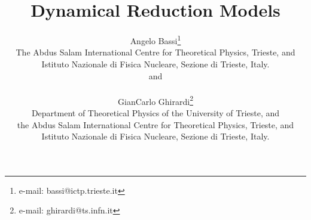 \documentclass[12pt]{article}
\begin{document}
\title{\bf Dynamical Reduction Models}

\author{Angelo Bassi\footnote{e-mail: bassi@ictp.trieste.it}\\
{\small The Abdus Salam International Centre for
Theoretical Physics, Trieste, and}\\{\small Istituto Nazionale di Fisica
Nucleare, Sezione di Trieste, Italy.}\\ and\\
\\ GianCarlo Ghirardi\footnote{e-mail: ghirardi@ts.infn.it}\\
{\small Department of Theoretical Physics of the University of
Trieste, and}\\ {\small the Abdus Salam International Centre for
Theoretical Physics, Trieste, and}\\{\small Istituto Nazionale di
Fisica Nucleare, Sezione di Trieste, Italy.}}

\date{}

\maketitle
\end{document}

